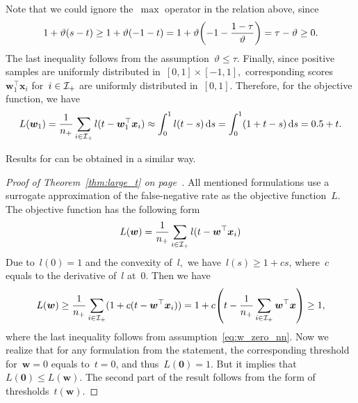 \begin{itemize}
  Note that we could ignore the~$\max$ operator in the relation above, since 
  \begin{equation*}
    1 + \vartheta(s - t)
      \geq 1 + \vartheta(-1 - t)
      = 1 + \vartheta \Brac{-1 - \frac{1 - \tau}{\vartheta}}
      = \tau - \vartheta
      \geq 0.
  \end{equation*}
  The last inequality follows from the assumption~$\vartheta \leq \tau.$ Finally, since positive samples are uniformly distributed in~$[0,1]\times[-1,1],$ corresponding scores $\bm{w}_1^\top \bm{x}_i$  for~$i \in \mathcal{I}_{+}$ are uniformly distributed in~$[0,1].$ Therefore, for the objective function, we have
  \begin{equation*}
    L(\bm{w}_1)
      = \frac{1}{n_{+}} \sum_{i \in \mathcal{I}_{+}} l(t - \bm{w}_1^\top \bm{x}_i)
      \approx \int_{0}^{1} l(t-s)\mathop{}\!\mathrm{d}s
      = \int_{0}^{1} (1 + t - s)\mathop{}\!\mathrm{d}s
      = 0.5 + t.
  \end{equation*}
\end{itemize}
Results for \PatMatNP can be obtained in a similar way.

\pagebreak

\larget*
\begin{proof}[Proof of Theorem~\ref{thm:large_t} on page~\pageref{thm:large_t}]
  All mentioned formulations use a surrogate approximation of the false-negative rate as the objective function~$L.$ The objective function has the following form
  \begin{equation*}
    L(\bm{w})
      = \frac{1}{n_{+}}\sum_{i \in \mathcal{I}_{+}}l(t - \bm{w}^{\top} \bm{x}_i)
  \end{equation*}
  Due to~$l(0) = 1$ and the convexity of~$l,$ we have~$l(s) \geq 1 + cs$, where~$c$ equals to the derivative of~$l$ at~$0$. Then we have
  \begin{equation*}
    L(\bm{w}) 
      \geq \frac{1}{\npos} \sum_{i \in \Ipos}(1 + c(t-\bm{w}^{\top} \bm{x}_i))
      = 1 + c\Brac{t - \frac{1}{\npos}\sum_{i \in \Ipos}\bm{w}^{\top} \bm{x}}
      \geq 1,
  \end{equation*}
  where the last inequality follows from assumption~\eqref{eq:w_zero_nn}. Now we realize that for any formulation from the statement, the corresponding threshold for~$\bm{w}=0$ equals to~$t=0$, and thus~$L(\bm{0})=1$. But it implies that~$L(\bm{0}) \leq L(\bm{w})$. The second part of the result follows from the form of thresholds~$t(\bm{w})$.
\end{proof}

